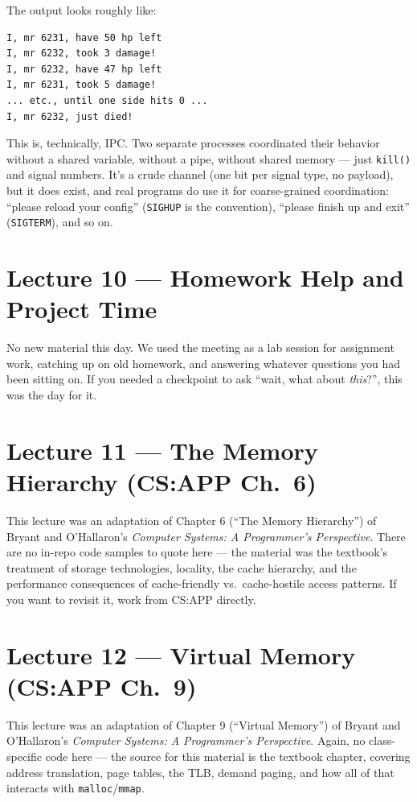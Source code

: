 \documentclass[11pt]{article}
\begin{document}
The output looks roughly like:

\begin{verbatim}
I, mr 6231, have 50 hp left
I, mr 6232, took 3 damage!
I, mr 6232, have 47 hp left
I, mr 6231, took 5 damage!
... etc., until one side hits 0 ...
I, mr 6232, just died!
\end{verbatim}

This is, technically, IPC. Two separate processes coordinated their
behavior without a shared variable, without a pipe, without shared
memory --- just \texttt{kill()} and signal numbers. It's a crude
channel (one bit per signal type, no payload), but it does exist, and
real programs do use it for coarse-grained coordination: ``please
reload your config'' (\texttt{SIGHUP} is the convention), ``please
finish up and exit'' (\texttt{SIGTERM}), and so on.

\section{Lecture 10 --- Homework Help and Project Time}

No new material this day. We used the meeting as a lab session for
assignment work, catching up on old homework, and answering whatever
questions you had been sitting on. If you needed a checkpoint to ask
``wait, what about \emph{this}?'', this was the day for it.

\section{Lecture 11 --- The Memory Hierarchy (CS:APP Ch.\ 6)}

This lecture was an adaptation of Chapter 6 (``The Memory
Hierarchy'') of Bryant and O'Hallaron's \emph{Computer Systems: A
Programmer's Perspective}. There are no in-repo code samples to
quote here --- the material was the textbook's treatment of storage
technologies, locality, the cache hierarchy, and the performance
consequences of cache-friendly vs.\ cache-hostile access patterns.
If you want to revisit it, work from CS:APP directly.

\section{Lecture 12 --- Virtual Memory (CS:APP Ch.\ 9)}

This lecture was an adaptation of Chapter 9 (``Virtual Memory'') of
Bryant and O'Hallaron's \emph{Computer Systems: A Programmer's
Perspective}. Again, no class-specific code here --- the source for
this material is the textbook chapter, covering address translation,
page tables, the TLB, demand paging, and how all of that interacts
with \texttt{malloc}/\texttt{mmap}.
\end{document}
